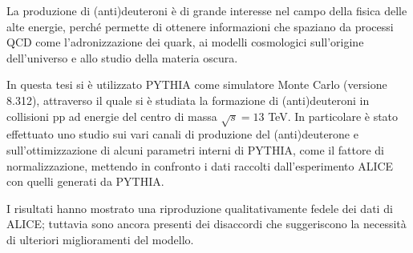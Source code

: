 La produzione di (anti)deuteroni è di grande interesse nel campo della fisica delle alte energie, perché permette di ottenere informazioni che spaziano da processi QCD come l'adronizzazione dei quark, ai modelli cosmologici sull'origine dell'universo e allo studio della materia oscura.

In questa tesi si è utilizzato PYTHIA come simulatore Monte Carlo (versione 8.312), attraverso il quale si è studiata la formazione di (anti)deuteroni in collisioni pp ad energie del centro di massa $\sqrt s = 13$ TeV.
In particolare è stato effettuato uno studio sui vari canali di produzione del (anti)deuterone e sull'ottimizzazione di alcuni parametri interni di PYTHIA, come il fattore di normalizzazione, mettendo in confronto i dati raccolti dall'esperimento ALICE con quelli generati da PYTHIA.

I risultati hanno mostrato una riproduzione qualitativamente fedele dei dati di ALICE; tuttavia sono ancora presenti dei disaccordi che suggeriscono la necessità di ulteriori miglioramenti del modello. 